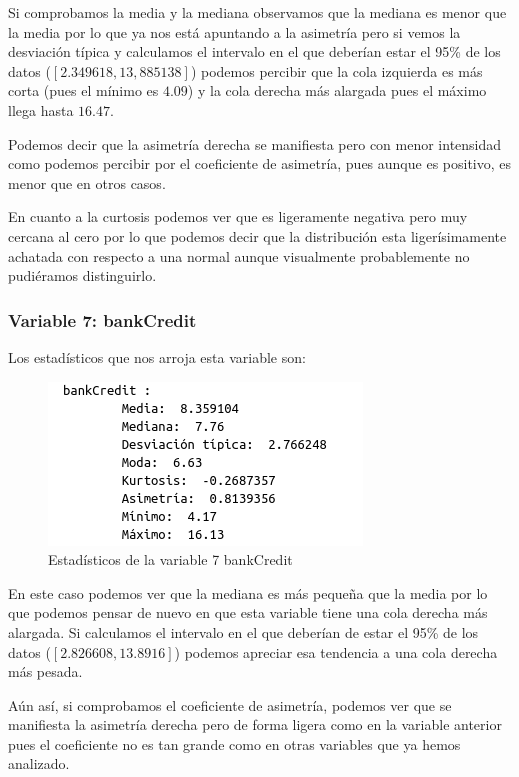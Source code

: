 \documentclass[12pt,a4paper]{article}
\begin{document}
Si comprobamos la media y la mediana observamos que la mediana es menor que la media por lo que ya nos está apuntando a la asimetría pero si vemos la desviación típica y calculamos el intervalo en el que deberían estar el 95\% de los datos ($[2.349618, 13,885138]$) podemos percibir que la cola izquierda es más corta (pues el mínimo es $4.09$) y la cola derecha más alargada pues el máximo llega hasta $16.47$.

Podemos decir que la asimetría derecha se manifiesta pero con menor intensidad como podemos percibir por el coeficiente de asimetría, pues aunque es positivo, es menor que en otros casos.

En cuanto a la curtosis podemos ver que es ligeramente negativa pero muy cercana al cero por lo que podemos decir que la distribución esta ligerísimamente achatada con respecto a una normal aunque visualmente probablemente no pudiéramos distinguirlo.

\subsubsection*{Variable 7: bankCredit}

Los estadísticos que nos arroja esta variable son:

\begin{figure}[H]
	\centering
	\includegraphics[scale=0.7]{./Imagenes/estadisticos_bankCredit.png}
	\caption{Estadísticos de la variable 7 bankCredit}
\end{figure}

En este caso podemos ver que la mediana es más pequeña que la media por lo que podemos pensar de nuevo en que esta variable tiene una cola derecha más alargada. Si calculamos el intervalo en el que deberían de estar el 95\% de los datos ($[2.826608,13.8916]$) podemos apreciar esa tendencia a una cola derecha más pesada. 

Aún así, si comprobamos el coeficiente de asimetría, podemos ver que se manifiesta la asimetría derecha pero de forma ligera como en la variable anterior pues el coeficiente no es tan grande como en otras variables que ya hemos analizado. 
\end{document}
